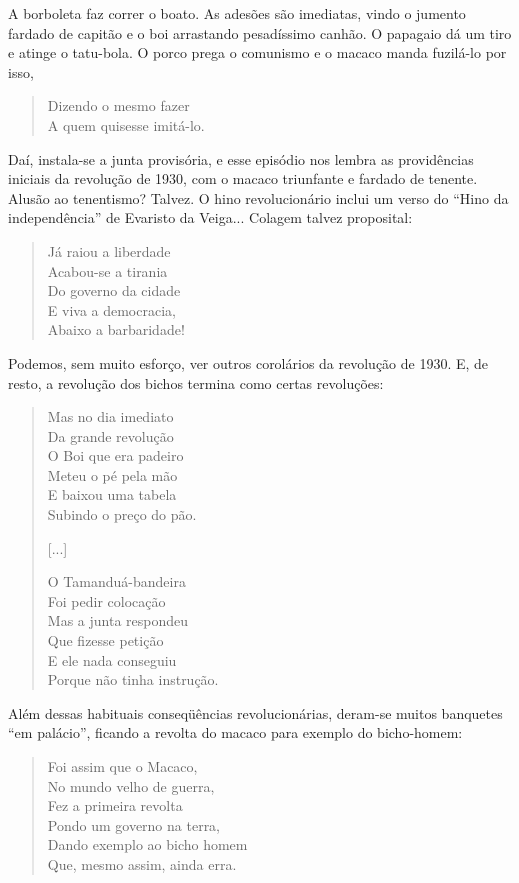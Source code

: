 A borboleta faz correr o boato. As adesões são imediatas, vindo o
jumento fardado de capitão e o boi arrastando pesadíssimo canhão. O
papagaio dá um tiro e atinge o tatu-bola. O porco prega o comunismo e
o macaco manda fuzilá-lo por isso,

\begin{verse}
Dizendo o mesmo fazer\\
A quem quisesse imitá-lo.
\end{verse}

Daí, instala-se a junta provisória, e esse episódio nos lembra as
providências iniciais da revolução de 1930, com o macaco triunfante e
fardado de tenente. Alusão ao tenentismo? Talvez. O hino
revolucionário inclui um verso do “Hino da independência” de Evaristo
da Veiga... Colagem talvez proposital:

\begin{verse}
Já raiou a liberdade\\
Acabou-se a tirania\\
Do governo da cidade\\
E viva a democracia,\\
Abaixo a barbaridade!
\end{verse}

Podemos, sem muito esforço, ver outros corolários da revolução de
1930. E, de resto, a revolução dos bichos termina como certas
revoluções:

\begin{verse}
Mas no dia imediato\\
Da grande revolução \\
O Boi que era padeiro\\
Meteu o pé pela mão\\
E baixou uma tabela\\
Subindo o preço do pão.

[...]

O Tamanduá-bandeira\\
Foi pedir colocação\\
Mas a junta respondeu\\
Que fizesse petição\\
E ele nada conseguiu\\
Porque não tinha instrução.
\end{verse}

Além dessas habituais conseqüências revolucionárias, deram-se muitos
banquetes “em palácio”, ficando a revolta do macaco para exemplo do
bicho-homem:

\begin{verse}
Foi assim que o Macaco,\\
No mundo velho de guerra,\\
Fez a primeira revolta\\
Pondo um governo na terra,\\
Dando exemplo ao bicho homem\\
Que, mesmo assim, ainda erra.
\end{verse}

